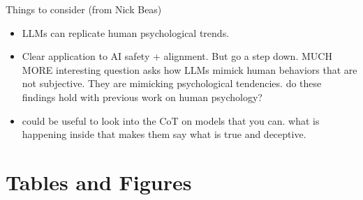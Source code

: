 \documentclass{article}
\begin{document}
Things to consider (from Nick Beas)
\begin{itemize}
    \item LLMs can replicate human psychological trends.
    \item Clear application to AI safety + alignment. But go a step down. MUCH MORE interesting question asks how LLMs mimick human behaviors that are not subjective. They are mimicking psychological tendencies. do these findings hold with previous work on human psychology?
    \item could be useful to look into the CoT on models that you can. what is happening inside that makes them say what is true and deceptive.
\end{itemize}




\newpage
\appendix

\section{Tables and Figures}
\end{document}
